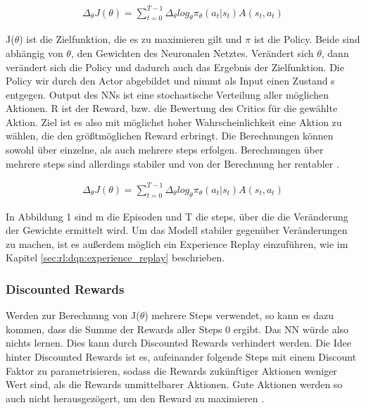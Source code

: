 \documentclass[12pt,a4paper]{article}
\begin{document}
\begin{eqnarray}
	\Delta _{ \theta } J(\theta) = \sum_{t=0}^{T-1} \Delta_{ \theta } log _{ \theta } \pi _{ \theta } (a_{t} | s_{t}) A(s_{t}, a_{t})
\end{eqnarray}

J($\theta$) ist die Zielfunktion, die es zu maximieren gilt und $\pi$ ist die Policy. Beide sind abhängig von $\theta$, den Gewichten des Neuronalen Netztes. Verändert sich $\theta$, dann verändert sich die Policy und dadurch auch das Ergebnis der Zielfunktion. Die Policy wir durch den Actor abgebildet und nimmt als Input einen Zustand s entgegen. Output des NNs ist eine stochastische Verteilung aller möglichen Aktionen. R ist der Reward, bzw. die Bewertung des Critics für die gewählte Aktion. Ziel ist es also mit möglichst hoher Wahrscheinlichkeit eine Aktion zu wählen, die den größtmöglichen Reward erbringt. Die Berechnungen können sowohl über einzelne, als auch mehrere steps erfolgen. Berechnungen über mehrere  steps sind allerdings stabiler und von der Berechnung her rentabler \cite{towardsdatascience:actor_critic}.

\begin{eqnarray}
	\Delta _{ \theta } J(\theta) = \sum_{t=0}^{T-1} \Delta_{ \theta } log _{ \theta } \pi _{ \theta } (a_{t} | s_{t}) A(s_{t}, a_{t})
\end{eqnarray}

In Abbildung 1 sind m die Episoden und T die steps, über die die Veränderung der Gewichte ermittelt wird.
Um das Modell stabiler gegenüber Veränderungen zu machen, ist es außerdem möglich ein Experience Replay einzuführen, wie im Kapitel \ref{sec:rl:dqn:experience_replay} beschrieben.


\subsubsection{Discounted Rewards}

Werden zur Berechnung von J($\theta$) mehrere Steps verwendet, so kann es dazu kommen, dass die Summe der Rewards aller Steps 0 ergibt. Das NN würde also nichts lernen. Dies kann durch Discounted Rewards verhindert werden. Die Idee hinter Discounted Rewards ist es, aufeinander folgende Steps mit einem Discount Faktor zu parametrisieren, sodass die Rewards zukünftiger Aktionen weniger Wert sind, als die Rewards unmittelbarer Aktionen. Gute Aktionen werden so auch nicht herausgezögert, um den Reward zu maximieren \cite{towardsdatascience:actor_critic}.
\end{document}
